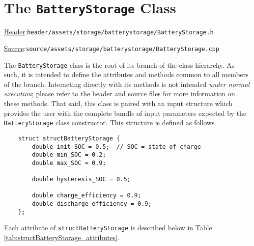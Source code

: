 \documentclass[12pt, letterpaper]{report}
\begin{document}
\section{The \texttt{BatteryStorage} Class}

\begin{large}
\noindent\underline{Header}:\quad\texttt{header/assets/storage/batterystorage/BatteryStorage.h}\par
\noindent\underline{Source}:\quad\texttt{source/assets/storage/batterystorage/BatteryStorage.cpp}\par
\end{large}
\vspace{5mm}

The \texttt{BatteryStorage} class is the root of its branch of the class hierarchy. As such, it is intended to define the attributes and methods common to all members of the branch. Interacting directly with its methods is not intended \textit{under normal execution}; please refer to the header and source files for more information on these methods. That said, this class is paired with an input structure which provides the user with the complete bundle of input parameters expected by the \texttt{BatteryStorage} class constructor. This structure is defined as follows

\begin{verbatim}
    struct structBatteryStorage {
        double init_SOC = 0.5;  // SOC = state of charge
        double min_SOC = 0.2;
        double max_SOC = 0.9;

        double hysteresis_SOC = 0.5;
        
        double charge_efficiency = 0.9;
        double discharge_efficiency = 0.9;
    };
\end{verbatim}

\noindent Each attribute of \texttt{structBatteryStorage} is described below in Table \ref{tab:structBatteryStorage_attributes}.
\end{document}

